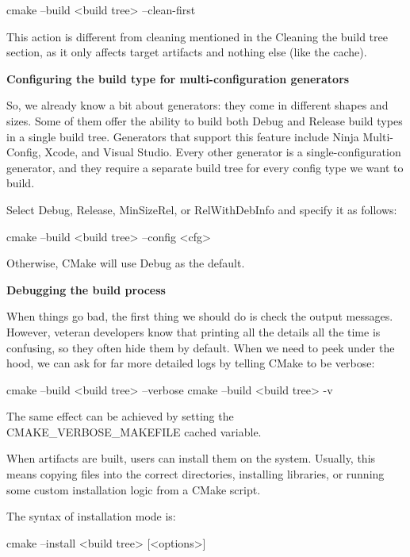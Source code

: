\begin{shell}
cmake --build <build tree> --clean-first
\end{shell}

This action is different from cleaning mentioned in the Cleaning the build tree section, as it only affects target artifacts and nothing else (like the cache).

\noindent
\textbf{Configuring the build type for multi-configuration generators}

So, we already know a bit about generators: they come in different shapes and sizes. Some of them offer the ability to build both Debug and Release build types in a single build tree. Generators that support this feature include Ninja Multi-Config, Xcode, and Visual Studio. Every other generator is a single-configuration generator, and they require a separate build tree for every config type we want to build.

Select Debug, Release, MinSizeRel, or RelWithDebInfo and specify it as follows:

\begin{shell}
cmake --build <build tree> --config <cfg>
\end{shell}

Otherwise, CMake will use Debug as the default.

\noindent
\textbf{Debugging the build process}

When things go bad, the first thing we should do is check the output messages. However, veteran developers know that printing all the details all the time is confusing, so they often hide them by default. When we need to peek under the hood, we can ask for far more detailed logs by telling CMake to be verbose:

\begin{shell}
cmake --build <build tree> --verbose
cmake --build <build tree> -v
\end{shell}

The same effect can be achieved by setting the CMAKE\_VERBOSE\_MAKEFILE cached variable.


When artifacts are built, users can install them on the system. Usually, this means copying files into the correct directories, installing libraries, or running some custom installation logic from a CMake script.

The syntax of installation mode is:

\begin{shell}
cmake --install <build tree> [<options>]
\end{shell}

